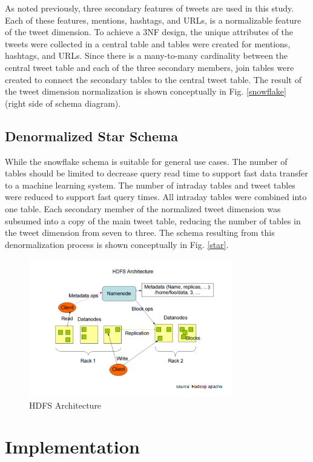 \documentclass[journal]{IEEEtran}
\begin{document}
As noted previously, three secondary features of tweets are used in this study.
Each of these features, mentions, hashtags, and URLs, is a normalizable
 feature of the tweet dimension.
To achieve a 3NF design, the unique attributes of the tweets were collected
 in a central table and tables were created for mentions, hashtags, and URLs.
Since there is a many-to-many cardinality between the central tweet table and each of 
 the three secondary members, join tables were created to connect the secondary tables 
 to the central tweet table. 
The result of the tweet dimension normalization is shown conceptually
 in Fig. \ref{snowflake} (right side of schema diagram).

\subsection{Denormalized Star Schema}

While the snowflake schema is suitable for general use cases.
The number of tables should be limited to decrease query read time to support
 fast data transfer to a machine learning system.
The number of intraday tables and tweet tables were reduced to support
 fast query times.
All intraday tables were combined into one table. 
Each secondary member of the normalized tweet dimension was
 subsumed into a copy of the main tweet table, reducing the number of tables
 in the tweet dimension from seven to three.
The schema resulting from this denormalization process is shown
 conceptually in Fig. \ref{star}.

\begin{figure}
	\centering
	\includegraphics[width=3.5in]{HDFS_Arch.png}
	\caption{HDFS Architecture \cite{HDFS}}
	\label{HDFS}
\end{figure}

\section{Implementation}
\end{document}
